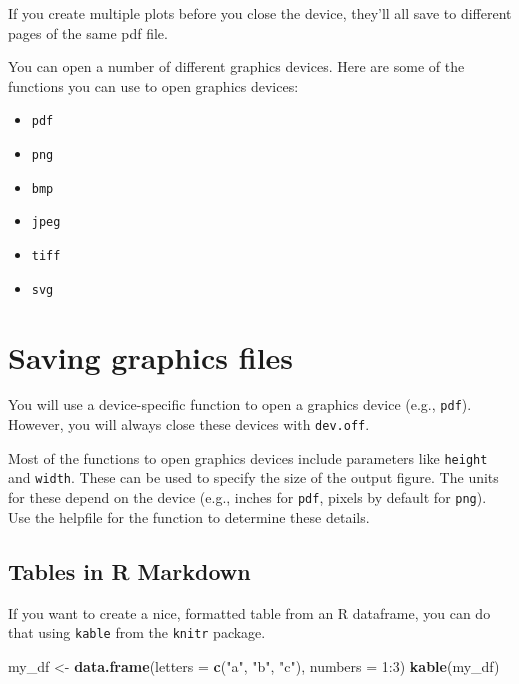 \documentclass[]{book}
\makeatletter
\newenvironment{Shaded}{\begin{snugshade}}{\end{snugshade}}
\newcommand{\KeywordTok}[1]{\textcolor[rgb]{0.13,0.29,0.53}{\textbf{{#1}}}}
\newcommand{\DataTypeTok}[1]{\textcolor[rgb]{0.13,0.29,0.53}{{#1}}}
\newcommand{\DecValTok}[1]{\textcolor[rgb]{0.00,0.00,0.81}{{#1}}}
\newcommand{\StringTok}[1]{\textcolor[rgb]{0.31,0.60,0.02}{{#1}}}
\newcommand{\NormalTok}[1]{{#1}}
\providecommand{\tightlist}{%
  \setlength{\itemsep}{0pt}\setlength{\parskip}{0pt}}
\newenvironment{kframe}{%
\medskip{}
\setlength{\fboxsep}{.8em}
 \def\at@end@of@kframe{}%
 \ifinner\ifhmode%
  \def\at@end@of@kframe{\end{minipage}}%
  \begin{minipage}{\columnwidth}%
 \fi\fi%
 \def\FrameCommand##1{\hskip\@totalleftmargin \hskip-\fboxsep
 \colorbox{shadecolor}{##1}\hskip-\fboxsep
     \hskip-\linewidth \hskip-\@totalleftmargin \hskip\columnwidth}%
 \MakeFramed {\advance\hsize-\width
   \@totalleftmargin\z@ \linewidth\hsize
   \@setminipage}}%
 {\par\unskip\endMakeFramed%
 \at@end@of@kframe}
\renewenvironment{Shaded}{\begin{kframe}}{\end{kframe}}
\makeatother
\begin{document}
If you create multiple plots before you close the device, they'll all
save to different pages of the same pdf file.

You can open a number of different graphics devices. Here are some of
the functions you can use to open graphics devices:

\begin{itemize}
\tightlist
\item
  \texttt{pdf}
\item
  \texttt{png}
\item
  \texttt{bmp}
\item
  \texttt{jpeg}
\item
  \texttt{tiff}
\item
  \texttt{svg}
\end{itemize}

\section{Saving graphics files}\label{saving-graphics-files-1}

You will use a device-specific function to open a graphics device (e.g.,
\texttt{pdf}). However, you will always close these devices with
\texttt{dev.off}.

Most of the functions to open graphics devices include parameters like
\texttt{height} and \texttt{width}. These can be used to specify the
size of the output figure. The units for these depend on the device
(e.g., inches for \texttt{pdf}, pixels by default for \texttt{png}). Use
the helpfile for the function to determine these details.

\subsection{Tables in R Markdown}\label{tables-in-r-markdown}

If you want to create a nice, formatted table from an R dataframe, you
can do that using \texttt{kable} from the \texttt{knitr} package.

\begin{Shaded}
\begin{Highlighting}[]
\NormalTok{my_df <-}\StringTok{ }\KeywordTok{data.frame}\NormalTok{(}\DataTypeTok{letters =} \KeywordTok{c}\NormalTok{(}\StringTok{"a"}\NormalTok{, }\StringTok{"b"}\NormalTok{, }\StringTok{"c"}\NormalTok{),}
                    \DataTypeTok{numbers =} \DecValTok{1}\NormalTok{:}\DecValTok{3}\NormalTok{)}
\KeywordTok{kable}\NormalTok{(my_df)}
\end{Highlighting}
\end{Shaded}
\end{document}
